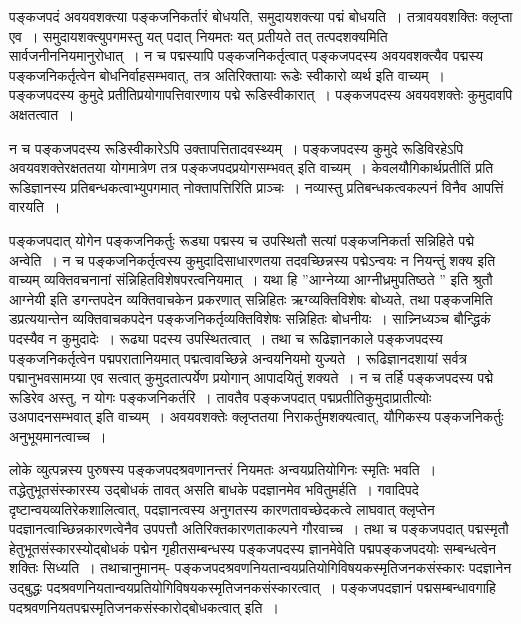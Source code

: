 			पङ्कजपदं अवयवशक्त्या पङ्कजनिकर्तारं बोधयति, समुदायशक्त्या पद्मं बोधयति~।  तत्रावयवशक्तिः क्लृप्ता एव~। समुदायशक्त्युपगमस्तु यत् पदात् नियमतः यत् प्रतीयते तत् तत्पदशक्यमिति सार्वजनीननियमानुरोधात्~।  न च पद्मस्यापि पङ्कजनिकर्तृत्वात् पङ्कजपदस्य अवयवशक्त्यैव पद्मस्य पङ्कजनिकर्तृत्वेन बोधनिर्वाहसम्भवात्, तत्र अतिरिक्तायाः रूडेः स्वीकारो व्यर्थ इति वाच्यम्~।  पङ्कजपदस्य कुमुदे प्रतीतिप्रयोगापत्तिवारणाय पद्मे रूडिस्वीकारात्~।  पङ्कजपदस्य अवयवशक्तेः कुमुदावपि  अक्षतत्वात~। 

			न च पङ्कजपदस्य रूडिस्वीकारेऽपि उक्तापत्तितादवस्थ्यम्~।  पङ्कजपदस्य कुमुदे रूडिविरहेऽपि  अवयवशक्तेरक्षततया योगमात्रेण तत्र पङ्कजपदप्रयोगसम्भवत् इति वाच्यम्~।  केवलयौगिकार्थप्रतीतिं प्रति रूडिज्ञानस्य प्रतिबन्धकत्वाभ्युपगमात् नोक्तापत्तिरिति प्राञ्चः~।  नव्यास्तु प्रतिबन्धकत्वकल्पनं विनैव आपत्तिं वारयति~।

			पङ्कजपदात् योगेन पङ्कजनिकर्तुः रूड्या पद्मस्य च उपस्थितौ सत्यां पङ्कजनिकर्ता सन्निहिते पद्मे अन्वेति~। न च पङ्कजनिकर्तृत्वस्य कुमुदादिसाधारणतया तदवच्छिन्नस्य पद्मेऽन्वयः न नियन्तुं शक्य इति वाच्यम् व्यक्तिवचनानां संन्निहितविशेषपरत्वनियमात्~।  यथा हि ”आग्नेय्या आग्नीध्रमुपतिष्ठते ” इति श्रुतौ आग्नेयी इति डगन्तपदेन व्यक्तिवाचकेन प्रकरणात् सन्निहितः ऋग्व्यक्तिविशेषः बोध्यते, तथा पङ्कजमिति डप्रत्ययान्तेन व्यक्तिवाचकपदेन पङ्कजनिकर्तृव्यक्तिविशेषः सन्निहितः बोधनीयः~।  सान्न्निध्यञ्च बौन्द्धिकं पदस्यैव न कुमुदादेः~।  रूढ्या पदस्य उपस्थितत्वात्~।  तथा च रूढिज्ञानकाले पङ्कजपदस्य पङ्कजनिकर्तृत्वेन पद्मपरातानियमात् पद्मत्वावच्छिन्ने अन्वयनियमो युज्यते~।  रूढिज्ञानदशायां सर्वत्र पद्मानुभवसामग्र्या एव सत्वात् कुमुदतात्पर्येण प्रयोगान् आपादयितुं शक्यते~।  न च तर्हि पङ्कजपदस्य पद्मे रूडिरेव अस्तु, न योगः पङ्कजनिकर्तरि~।  तावतैव पङ्कजपदात् पद्मप्रतीतिकुमुदाप्रातीत्योः उअपादनसम्भवात् इति वाच्यम्~।  अवयवशक्तेः क्लृप्ततया निराकर्तुमशक्यत्वात्, यौगिकस्य पङ्कजनिकर्तुः अनुभूयमानत्वाच्च~। 
		
			लोके व्युत्पन्नस्य पुरुषस्य पङ्कजपदश्रवणानन्तरं नियमतः अन्वयप्रतियोगिनः स्मृतिः भवति~। तद्धेतुभूतसंस्कारस्य उद्बोधकं तावत् असति बाधके पदज्ञानमेव भवितुमर्हति~।  गवादिपदे दृष्टान्वयव्यतिरेकशालित्वात्, पदज्ञानत्वस्य अनुगतस्य कारणतावच्छेदकत्वे  लाघवात् क्लृप्तेन पदज्ञानत्वाच्छिन्नकारणत्वेनैव उपपत्तौ अतिरिक्तकारणताकल्पने गौरवाच्च~।  तथा च पङ्कजपदात् पद्मस्मृतौ हेतुभूतसंस्कारस्योद्बोधकं  पद्मेन गृहीतसम्बन्धस्य पङ्कजपदस्य ज्ञानमेवेति पद्मपङ्कजपदयोः सम्बन्धत्वेन शक्तिः सिध्यति~।  तथाचानुमानम्- पङ्कजपदश्रवणनियतान्वयप्रतियोगिविषयकस्मृतिजनकसंस्कारः पदज्ञानेन उद्बुद्धः पदश्रवणनियतान्वयप्रतियोगिविषयकस्मृतिजनकसंस्कारत्वात्~। पङ्कजपदज्ञानं पद्मसम्बन्धावगाहि पदश्रवणनियतपद्मस्मृतिजनकसंस्कारोद्बोधकत्वात् इति~। 

